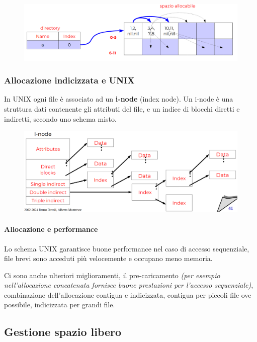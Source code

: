 \begin{figure} [h]
    \centering
    \includegraphics[width=0.7\linewidth]{Images/Screenshot 2025-01-18 at 16-45-53 so-07-filesystem.pdf.png}
\end{figure}

\subsubsection{Allocazione indicizzata e UNIX}

In UNIX ogni file è associato ad un \textbf{i-node} (index node).
Un i-node è una struttura dati contenente gli attributi del file, e un indice di blocchi diretti e indiretti, secondo uno schema misto.

\begin{figure} [h]
    \centering
    \includegraphics[width=0.7\linewidth]{Images/Screenshot 2025-01-18 at 16-49-53 so-07-filesystem.pdf.png}
\end{figure}

\paragraph{Allocazione e performance}
Lo schema UNIX garantisce buone performance nel caso di accesso sequenziale, file brevi sono acceduti più velocemente e occupano meno memoria.

Ci sono anche ulteriori miglioramenti, il pre-caricamento \textit{(per esempio nell’allocazione concatenata fornisce buone prestazioni per l’accesso sequenziale)}, combinazione dell’allocazione contigua e indicizzata, contigua per piccoli file ove possibile, indicizzata per grandi file.

\subsection{Gestione spazio libero}
